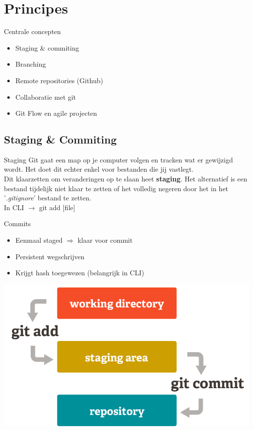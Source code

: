 \documentclass[11pt]{beamer}
\begin{document}
\section{Principes}
\begin{frame}{Centrale concepten}
\begin{itemize}
\item Staging \& commiting
\item Branching
\item Remote repositories (Github)
\item Collaboratie met git
\item Git Flow en agile projecten
\end{itemize}
\end{frame}

\subsection{Staging \& Commiting}
\begin{frame}{Staging}
Git gaat een map op je computer volgen en tracken wat er gewijzigd wordt. Het doet dit echter enkel voor bestanden die jij vastlegt.\\
\vspace{8pt}
Dit klaarzetten om veranderingen op te slaan heet \textbf{staging}. Het alternatief is een bestand tijdelijk niet klaar te zetten of het volledig negeren door het in het '\textit{.gitignore}' bestand te zetten.\\
\vspace{8pt}
In CLI $\rightarrow$ git add [file]
\end{frame}

\begin{frame}{Commits}
\begin{itemize}
\item Eenmaal staged $\Rightarrow$ klaar voor commit
\item Persistent wegschrijven
\item Krijgt hash toegewezen (belangrijk in CLI)
\end{itemize}
\center
\includegraphics[scale=.25]{git_staging_commit.png}
\end{frame}
\end{document}
